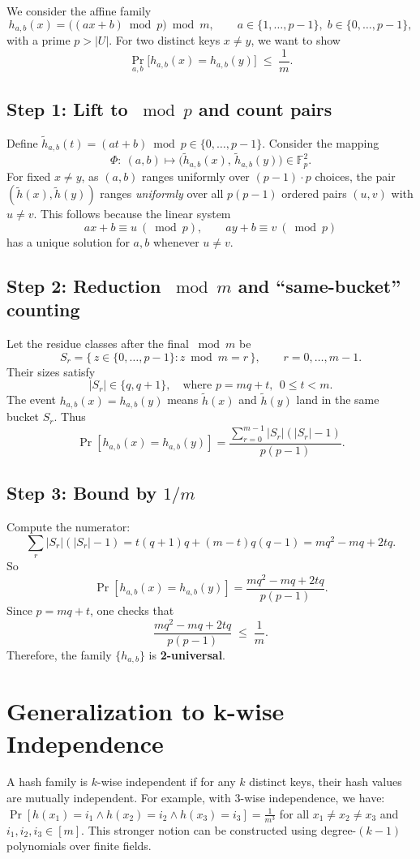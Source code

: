 \documentclass[11pt]{article}
\begin{document}
We consider the affine family
\[
h_{a,b}(x)=\big((a x+b)\bmod p\big)\bmod m,
\qquad a\in\{1,\dots,p-1\},\; b\in\{0,\dots,p-1\},
\]
with a prime $p > |U|$. For two distinct keys $x\neq y$, we want to show
\[
\Pr_{a,b}\big[h_{a,b}(x)=h_{a,b}(y)\big]\;\le\;\frac1m.
\]

\subsection*{Step 1: Lift to $\bmod p$ and count pairs}
Define $\tilde h_{a,b}(t)=(a t+b)\bmod p \in \{0,\dots,p-1\}$.
Consider the mapping
\[
\Phi:\ (a,b)\mapsto \big(\tilde h_{a,b}(x),\,\tilde h_{a,b}(y)\big) \in \mathbb{F}_p^2 .
\]
For fixed $x\neq y$, as $(a,b)$ ranges uniformly over $(p-1)\cdot p$ choices, the pair $(\tilde h(x),\tilde h(y))$ ranges \emph{uniformly} over all $p(p-1)$ ordered pairs $(u,v)$ with $u\neq v$.
This follows because the linear system
\[
ax+b\equiv u\ (\bmod p), \qquad ay+b\equiv v\ (\bmod p)
\]
has a unique solution for $a,b$ whenever $u\neq v$.

\subsection*{Step 2: Reduction $\bmod m$ and ``same-bucket'' counting}
Let the residue classes after the final $\bmod m$ be
\[
S_r=\{\,z\in\{0,\dots,p-1\}: z \bmod m = r\,\},\qquad r=0,\dots,m-1.
\]
Their sizes satisfy
\[
|S_r|\in\{q, q+1\},\quad\text{where }p=mq+t,\ \ 0\le t<m.
\]
The event $h_{a,b}(x)=h_{a,b}(y)$ means $\tilde h(x)$ and $\tilde h(y)$ land in the same bucket $S_r$.
Thus
\[
\Pr[h_{a,b}(x)=h_{a,b}(y)]
= \frac{\sum_{r=0}^{m-1} |S_r|(|S_r|-1)}{p(p-1)}.
\]

\subsection*{Step 3: Bound by $1/m$}
Compute the numerator:
\[
\sum_{r} |S_r|(|S_r|-1)
= t(q+1)q + (m-t)q(q-1)
= m q^2 - m q + 2t q.
\]
So
\[
\Pr[h_{a,b}(x)=h_{a,b}(y)]
= \frac{m q^2 - m q + 2t q}{p(p-1)}.
\]
Since $p=mq+t$, one checks that
\[
\frac{m q^2 - m q + 2t q}{p(p-1)} \;\le\; \frac1m.
\]
Therefore, the family $\{h_{a,b}\}$ is \textbf{2-universal}.

\section{Generalization to k-wise Independence}
A hash family is $k$-wise independent if for any $k$ distinct keys, their hash values are mutually independent.
For example, with 3-wise independence, we have: $\Pr[h(x_1)=i_1 \wedge h(x_2)=i_2 \wedge h(x_3)=i_3] = \frac{1}{m^3}$ for all $x_1 \neq x_2 \neq x_3$ and $i_1,i_2,i_3 \in [m]$.
This stronger notion can be constructed using degree-$(k-1)$ polynomials over finite fields.
\end{document}

